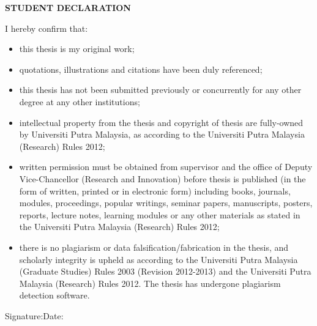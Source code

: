 
\begin{center}
		{\bf STUDENT DECLARATION}
\end{center}



\noindent I hereby confirm that:
\begin{itemize}[label={$\bullet$},noitemsep,leftmargin=*,topsep=0pt,partopsep=0pt]
\vspace{-10pt} 
		\item this thesis is my original work;
		\item quotations, illustrations and citations have been duly referenced;
		\item this thesis has not been submitted previously or concurrently for any other degree at any other institutions;
		\item intellectual property from the thesis and copyright of thesis are fully-owned by Universiti Putra Malaysia, as according to the Universiti Putra Malaysia (Research) Rules 2012;
		\item written permission must be obtained from supervisor and the office of Deputy Vice-Chancellor (Research and Innovation) before thesis is published (in the form of written, printed or in electronic form) including books, journals, modules, proceedings, popular writings, seminar papers, manuscripts, posters, reports, lecture notes, learning modules or any other materials as stated in the Universiti Putra Malaysia (Research) Rules 2012;
		\item there is no plagiarism or data falsification/fabrication in the thesis, and scholarly integrity is upheld as according to the Universiti Putra Malaysia (Graduate Studies) Rules 2003 (Revision 2012-2013) and the Universiti Putra Malaysia (Research) Rules 2012. The thesis has undergone plagiarism detection software.
	\end{itemize}


\vspace{0.2cm}

\noindent Signature:\hrulefill  Date:\hrulefill

\vspace{0.5cm}

